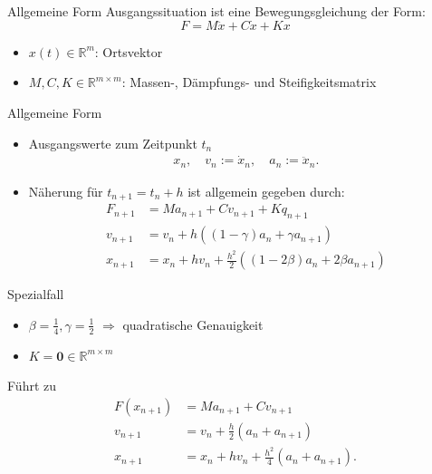 \documentclass[aspectratio=169]{beamer}
\begin{document}
\begin{frame}{Allgemeine Form}
Ausgangssituation ist eine Bewegungsgleichung der Form:
\begin{equation*}
	F = M \ddot{x} + C \dot{x} + Kx
\end{equation*}

\begin{itemize}
	\item $x(t) \in \mathbb{R}^{m}$: Ortsvektor
	\item $M, C, K \in \mathbb{R}^{m \times m}$: Massen-, Dämpfungs- und Steifigkeitsmatrix
\end{itemize}
\end{frame}

\begin{frame}{Allgemeine Form}

\begin{itemize}
\item Ausgangswerte zum Zeitpunkt $t_n$
\begin{align*}
	x_n, \quad v_n := \dot{x}_n, \quad a_n := \ddot{x}_n.
\end{align*}
\item Näherung für $t_{n+1} = t_n + h$ ist allgemein gegeben durch:
\begin{align*}
	F_{n+1} &= M a_{n+1} + C v_{n+1} + K q_{n+1}\\
	v_{n+1} &= v_{n} + h\left({\left(1 - \gamma\right) a_{n} + \gamma{a_{n+1}}}\right)\\
	x_{n+1} &= x_{n} + h v_{n} + \frac{h^2}{2} \left({\left(1 - 2\beta\right) a_{n} + 2\beta a_{n+1}}\right)
\end{align*}
\end{itemize}

\end{frame}


\begin{frame}{Spezialfall}
\begin{itemize}
	\item  $\beta = \frac{1}{4}, \gamma = \frac{1}{2}$ $\Rightarrow$ quadratische Genauigkeit
	\item $K = \mathbf{0} \in \mathbb{R}^{m \times m}$
\end{itemize}
Führt zu
\begin{align*}
	F(x_{n+1}) &= M a_{n+1} + C v_{n+1}\\
	v_{n+1} &= v_n + \frac{h}{2} (a_n + a_{n+1})\\
	x_{n+1} &= x_n + h v_n + \frac{h^2}{4} (a_n + a_{n+1}).
\end{align*}
\end{frame}
\end{document}
